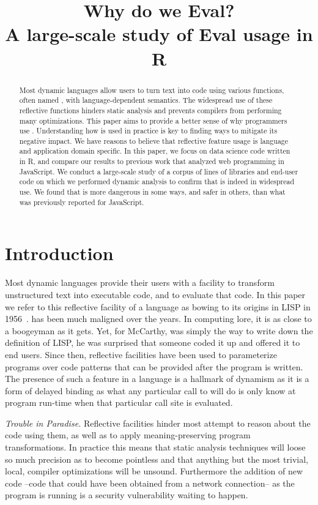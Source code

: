 \documentclass[USenglish,cleveref, autoref, thm-restate]{lipics-v2019}
\title{Why do we Eval?\\[2mm]\Large A large-scale study of Eval usage in R}
\begin{document}
\maketitle

\begin{abstract}
  \noindent Most dynamic languages allow users to turn text into code
  using various functions, often named \eval, with language-dependent
  semantics. The widespread use of these reflective functions hinders
  static analysis and prevents compilers from performing many
  optimizations. This paper aims to provide a better sense of why
  programmers use \eval.  Understanding how \eval is used in practice
  is key to finding ways to mitigate its negative impact. We have
  reasons to believe that reflective feature usage is language and
  application domain specific. In this paper, we focus on data science
  code written in R, and compare our results to previous work that
  analyzed web programming in JavaScript.  We conduct a large-scale
  study of a corpus of \CorpusAllCodeRnd lines of libraries and
  end-user code on which we performed dynamic analysis to confirm that
  \eval is indeed in widespread use. We found that \eval is more
  dangerous in some ways, and safer in others, than what was
  previously reported for JavaScript.
\end{abstract}


\section{Introduction}

Most dynamic languages provide their users with a facility to
transform unstructured text into executable code, and to evaluate that
code. In this paper we refer to this reflective facility of a language
as \eval bowing to its origins in LISP in 1956~\cite{lisp}. \Eval has
been much maligned over the years. In computing lore, it is as close
to a boogeyman as it gets. Yet, for McCarthy, \eval was simply the way
to write down the definition of LISP, he was surprised that someone
coded it up and offered it to end users.  Since then, reflective
facilities have been used to parameterize programs over code patterns
that can be provided after the program is written.  The presence of
such a feature in a language is a hallmark of dynamism as it is a form
of delayed binding as what any particular call to \eval will do is
only know at program run-time when that particular call site is
evaluated.

\vspace{2mm}\noindent\emph{Trouble in Paradise.} Reflective facilities
hinder most attempt to reason about the code using them, as well as to
apply meaning-preserving program transformations. In practice this
means that static analysis techniques will loose so much precision as
to become pointless and that anything but the most trivial, local,
compiler optimizations will be unsound. Furthermore the addition of
new code --code that could have been obtained from a network
connection-- as the program is running is a security vulnerability
waiting to happen.
\end{document}
